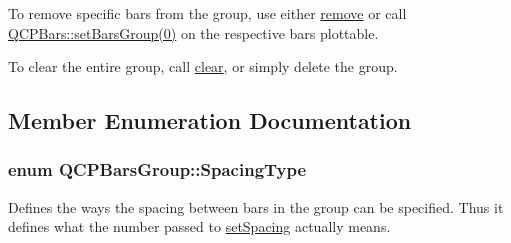 To remove specific bars from the group, use either \hyperlink{class_q_c_p_bars_group_a215e28a5944f1159013a0e19169220e7}{remove} or call \hyperlink{class_q_c_p_bars_aedd1709061f0b307c47ddb45e172ef9a}{Q\+C\+P\+Bars\+:\+:set\+Bars\+Group(0)} on the respective bars plottable.

To clear the entire group, call \hyperlink{class_q_c_p_bars_group_a3ddf23928c6cd89530bd34ab7ba7b177}{clear}, or simply delete the group. 

\subsection{Member Enumeration Documentation}
\hypertarget{class_q_c_p_bars_group_a4c0521120a97e60bbca37677a37075b6}{}
\subsubsection[{Spacing\+Type}]{\setlength{\rightskip}{0pt plus 5cm}enum {\bf Q\+C\+P\+Bars\+Group\+::\+Spacing\+Type}}\label{class_q_c_p_bars_group_a4c0521120a97e60bbca37677a37075b6}
Defines the ways the spacing between bars in the group can be specified. Thus it defines what the number passed to \hyperlink{class_q_c_p_bars_group_aa553d327479d72a0c3dafcc724a190e2}{set\+Spacing} actually means.

